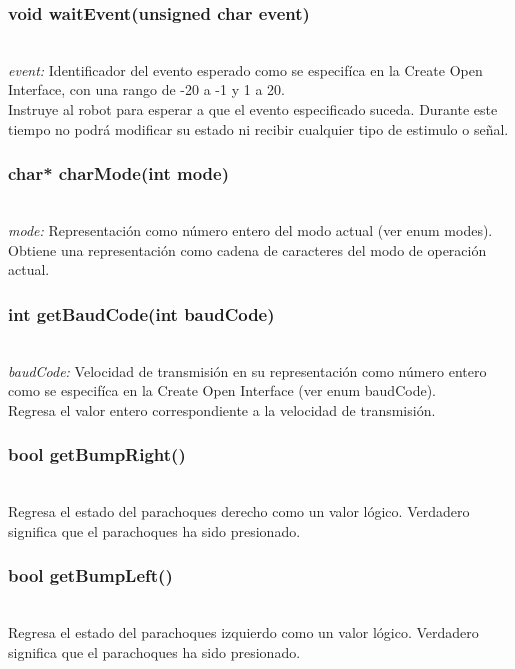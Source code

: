 \documentclass[letterpaper]{book}
\begin{document}
\subsubsection{void waitEvent(unsigned char event)}\mbox{}\\	
\emph{event: } Identificador del evento esperado como se especifíca en la Create Open Interface, con una rango de -20 a -1 y 1 a 20.\\
Instruye al robot para esperar a que el evento especificado suceda. Durante este tiempo no podrá modificar su estado ni recibir cualquier tipo de estimulo o señal.\\

\subsubsection{char* charMode(int mode)}\mbox{}\\
\emph{mode: } Representación como número entero del modo actual (ver enum modes).\\
Obtiene una representación como cadena de caracteres del modo de operación actual.\\
\subsubsection{int getBaudCode(int baudCode)}\mbox{}\\
\emph{baudCode: } Velocidad de transmisión en su representación como número entero como se especifíca en la Create Open Interface (ver enum baudCode).\\
Regresa el valor entero correspondiente a la velocidad de transmisión.\\

\subsubsection{bool getBumpRight()}\mbox{}\\
Regresa el estado del parachoques derecho como un valor lógico. Verdadero significa que el parachoques ha sido presionado.\\
\subsubsection{bool getBumpLeft()}\mbox{}\\
Regresa el estado del parachoques izquierdo como un valor lógico. Verdadero significa que el parachoques ha sido presionado.\\
\end{document}
